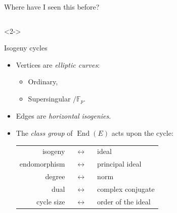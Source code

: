 \documentclass[aspectratio=169]{beamer}
\newcommand{\F}{\mathbb{F}}
\DeclareMathOperator{\End}{End}
\begin{document}
\begin{frame}{Where have I seen this before?}
  \begin{columns}
    \begin{column}{0.6\textwidth}
      \begin{uncoverenv}<2->
        \begin{block}{Isogeny cycles}
          \begin{itemize}
          \item Vertices are \emph{elliptic curves}:
            \begin{itemize}
            \item Ordinary,
              \hfill{}
            \item Supersingular $/\F_p$.
              \hfill{}
            \end{itemize}
          \item Edges are \emph{horizontal isogenies}.
          \item<3-> The \emph{class group} of $\End(E)$ acts upon the
            cycle:

            \smallskip
            \begin{tabular}{r c l}
              isogeny & ~$\leftrightarrow$~ & ideal\\
              endomorphism  & ~$\leftrightarrow$~ & principal ideal\\
              degree & ~$\leftrightarrow$~ & norm\\
              dual & ~$\leftrightarrow$~ & complex conjugate\\
              cycle size & ~$\leftrightarrow$~ & order of the ideal
            \end{tabular}
          \end{itemize}
        \end{block}
      \end{uncoverenv}
    \end{column}
    \begin{column}{0.4\textwidth}
      \centering
    \end{column}      
  \end{columns}
\end{frame}
\end{document}
